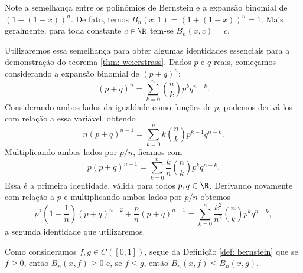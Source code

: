 Note a semelhança entre os polinômios de Bernstein e a expansão binomial de \( ( 1 + ( 1 - x ) )^{ n } \).
De fato, temos \( B_{ n } (x, 1) = ( 1 + ( 1 - x ) )^{ n } = 1 \).
Mais geralmente, para toda constante \( c \in \R \) tem-se \( B_{ n } (x, c) = c \).

Utilizaremos essa semelhança para obter algumas identidades essenciais para a demonstração do teorema \ref{thm: weierstrass}.
Dados \( p \) e \( q \) reais, começamos considerando a expansão binomial de \( ( p + q )^{ n } \):\[
    ( p + q )^{ n } =
    \sum_{ k=0 }^{ n } \binom{n}{k} p^{ k } q^{ n-k }
.\]
Considerando ambos lados da igualdade como funções de \( p \), podemos derivá-los com relação a essa variável, obtendo \[
    n ( p + q )^{ n-1 } =
    \sum_{ k=0 }^{ n } k \binom{n}{k} p^{ k-1 } q^{ n-k }
.\]
Multiplicando ambos lados por \( p/n \), ficamos com
    \begin{equation}
        p ( p + q )^{ n-1 } =
        \sum_{ k=0 }^{ n } \frac{ k }{ n } \binom{n}{k} p^{ k } q^{ n-k }
        \label{eq: id_1}
    .\end{equation}
Essa é a primeira identidade, válida para todos \( p, q \in \R \).
Derivando novamente com relação a \( p \) e multiplicando ambos lados por \( p/n \) obtemos
\begin{equation}
    p^2 \left( 1 - \frac{ 1 }{ n } \right) ( p + q )^{ n-2 } + \frac{ p }{ n } ( p + q )^{ n-1 } =
    \sum_{ k=0 }^{ n } \frac{ k^2 }{ n^2 } \binom{n}{k} p^{ k } q^{ n-k }
    \label{eq: id_2}
,\end{equation}
a segunda identidade que utilizaremos.


Como consideramos \( f, g \in C([0, 1]) \), segue da Definição \ref{def: bernstein} que se \( f \geq 0 \), então \( B_{ n } (x, f) \geq 0 \) e, se \( f \leq g \), então \( B_{ n } (x, f) \leq B_{ n } (x, g) \).

